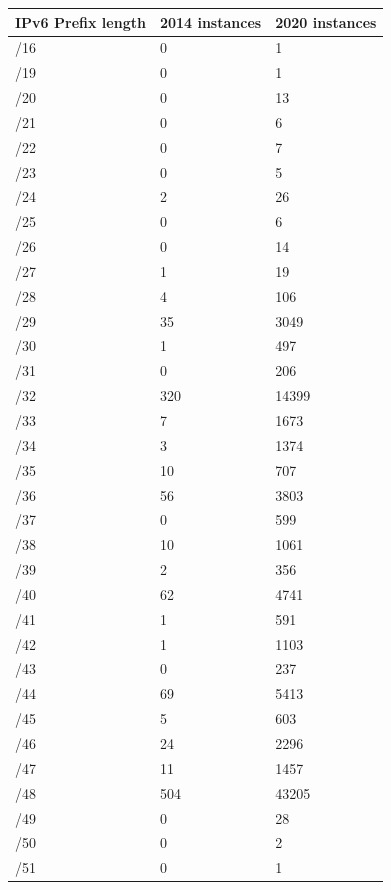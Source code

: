 \documentclass[10pt,sigconf]{acmart}
\begin{document}
\begin{table}[]
\centering
\label{ipv6-scanning}
\begin{center}
	\begin{tabular}{|l|l|l|}
		\hline
		IPv6 Prefix length & 2014 instances & 2020 instances   \\ \hline
		/16 & 0 & 1   \\ \hline
		/19 & 0 & 1   \\ \hline
		/20 & 0 & 13   \\ \hline
		/21 & 0 & 6  \\ \hline
		/22 & 0 & 7   \\ \hline
		/23 & 0 & 5   \\ \hline
		/24 & 2 & 26   \\ \hline
		/25 & 0 & 6   \\ \hline
		/26 & 0 & 14   \\ \hline
		/27 & 1 & 19   \\ \hline
		/28 & 4 & 106   \\ \hline
		/29 & 35 & 3049   \\ \hline
		/30 & 1 & 497   \\ \hline
		/31 & 0 & 206   \\ \hline
		/32 & 320 & 14399   \\ \hline
		/33 & 7 & 1673   \\ \hline
		/34 & 3 & 1374   \\ \hline
		/35 & 10 & 707   \\ \hline
		/36 & 56 & 3803   \\ \hline
		/37 & 0 & 599   \\ \hline
		/38 & 10 & 1061   \\ \hline
		/39 & 2 & 356   \\ \hline
		/40 & 62 & 4741   \\ \hline
		/41 & 1 & 591   \\ \hline
		/42 & 1 & 1103   \\ \hline
		/43 & 0 & 237   \\ \hline
		/44 & 69 & 5413   \\ \hline
		/45 & 5 & 603   \\ \hline
		/46 & 24 & 2296  \\ \hline
		/47 & 11 & 1457   \\ \hline
		/48 & 504 & 43205   \\ \hline
		/49 & 0 & 28   \\ \hline
		/50 & 0 & 2   \\ \hline
		/51 & 0 & 1   \\ \hline

\end{tabular}
\end{center}
\end{table}
\end{document}
